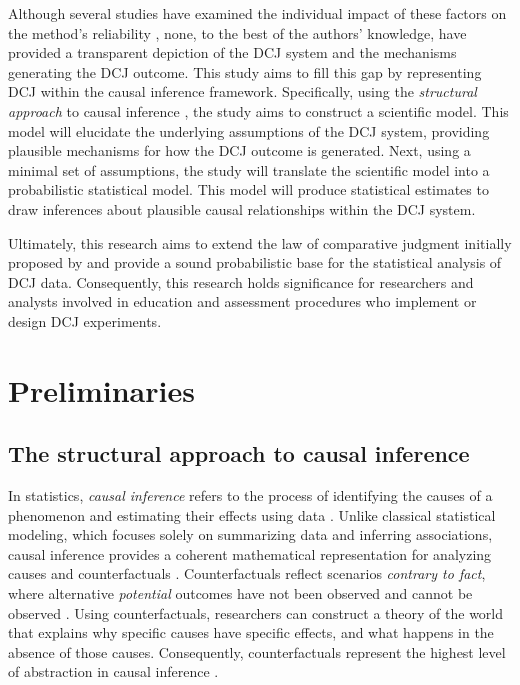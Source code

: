 \documentclass[
  authoryear,
  preprint,
  1p]{elsarticle}
\begin{document}
Although several studies have examined the individual impact of these
factors on the method's reliability
\citep{Bramley_2015, Pollitt_2012b, Bramley_et_al_2019, Verhavert_et_al_2019, Crompvoets_et_al_2022, vanDaal_et_al_2017, Gijsen_et_al_2021},
none, to the best of the authors' knowledge, have provided a transparent
depiction of the DCJ system and the mechanisms generating the DCJ
outcome. This study aims to fill this gap by representing DCJ within the
causal inference framework. Specifically, using the \emph{structural
approach} to causal inference
\citep{Wright_1921, Pearl_2009, Pearl_et_al_2016}, the study aims to
construct a scientific model. This model will elucidate the underlying
assumptions of the DCJ system, providing plausible mechanisms for how
the DCJ outcome is generated. Next, using a minimal set of assumptions,
the study will translate the scientific model into a probabilistic
statistical model. This model will produce statistical estimates to draw
inferences about plausible causal relationships within the DCJ system.

Ultimately, this research aims to extend the law of comparative judgment
initially proposed by \citet{Thurstone_1927} and provide a sound
probabilistic base for the statistical analysis of DCJ data.
Consequently, this research holds significance for researchers and
analysts involved in education and assessment procedures who implement
or design DCJ experiments.

\section{Preliminaries}\label{sec-prelim}

\subsection{The structural approach to causal
inference}\label{sec-prelim-structural}

In statistics, \emph{causal inference} refers to the process of
identifying the causes of a phenomenon and estimating their effects
using data \citep{Shaughnessy_et_al_2010, Neal_2020}. Unlike classical
statistical modeling, which focuses solely on summarizing data and
inferring associations, causal inference provides a coherent
mathematical representation for analyzing causes and counterfactuals
\citep{Pearl_2009}. Counterfactuals reflect scenarios \emph{contrary to
fact}, where alternative \emph{potential} outcomes have not been
observed and cannot be observed \citep{Neal_2020, Counterfactual_2024}.
Using counterfactuals, researchers can construct a theory of the world
that explains why specific causes have specific effects, and what
happens in the absence of those causes. Consequently, counterfactuals
represent the highest level of abstraction in causal inference
\citep{Pearl_et_al_2018}.
\end{document}
